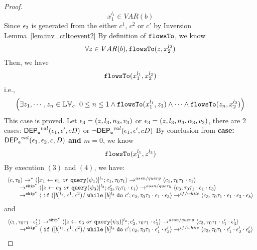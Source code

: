 {\begin{proof}
 \[
  x_1^{l_1} \in VAR(b)
 \]
 Since $\mathtt{\epsilon}_2$ is generated from the either $c^1$, $c^2$ or $c'$ by {Inversion Lemma~\ref{lem:inv_ctltoevent2}}
 By definition of $\mathtt{flowsTo}$, we know
 \[
 \forall z \in VAR(b), \mathtt{flowsTo}(z, x_2^{l2})
 \]
 Then, we have
 \[
 \mathtt{flowsTo}(x_1^{l_1}, x_2^{l_2})
 \]
 i.e.,
 \[
 \Big( \exists z_1, \cdots, z_n \in \mathbb{LV}_{{c}}. ~ 0 \leq n \leq 1 \land
  \mathtt{flowsTo}(x_1^{l_1}, z_1) 
  \land \cdots \land \mathtt{flowsTo}(z_n, x_2^{l_2}) \Big)
 \]
  This case is proved.
%
\subcaseL{$\event_3 \in \eventset^{\asn}$}
Let $\mathtt{\epsilon}_3 = (z, l_3, n_3, v_3)$ or $\mathtt{\epsilon}_3 = (z, l_3, n_3, \alpha_3, v_3)$, there are 2 cases:
$\mathsf{DEP_{\mathtt{e}}}^{val}(\mathtt{\epsilon}_1, \mathtt{\epsilon}', c D)$ or $\neg \mathsf{DEP_{\mathtt{e}}}^{val}(\mathtt{\epsilon}_1, \mathtt{\epsilon}', c D)$
%
%
By conclusion from \textbf{case: $\mathsf{DEP_{\mathtt{e}}}^{val}(\mathtt{\epsilon}_1, \mathtt{\epsilon}_2, c, D)$ and $m = 0$}, we know
\[
  \mathtt{flowsTo}(x_1^{l_1}, z^{l_3})
\]
%
By execution $(3)$ and $(4)$, we have:
\[
  \begin{array}{l}   
  \langle {c}, \mathtt{\tau}_0 \rangle 
  \rightarrow^{*} 
  \langle [\mathrel{ {x}_1 \leftarrow e_1~ or ~ {\tt query}(\psi_1) }]^{l_1} ; {c}_1, \mathtt{\tau}_0 \mathtt{\tau}_1 \rangle  \rightarrow^{assn/query}
 \langle c_1, \mathtt{\tau}_0 \mathtt{\tau}_1 \cdot \mathtt{\epsilon}_1 \rangle 
  \\ 
  \qquad \rightarrow^{\mathtt{skip}^*} 
  \langle [\mathrel{ z \leftarrow e_3~ or ~ {\tt query}(\psi_3) }]^{l_3}; {c}_2', 
  \mathtt{\tau}_0 \mathtt{\tau}_1 \cdot \mathtt{\epsilon}_1 \rangle 
  \rightarrow^{assn / query} 
  \langle {c}_3,  \mathtt{\tau}_0 \mathtt{\tau}_1 \cdot \mathtt{\epsilon}_1 \cdot \mathtt{\epsilon}_3 \rangle 
  \\ 
  \qquad \rightarrow^{\mathtt{skip}^*} 
  \langle \;\mathtt{if}\;([b]{}^{l_b}, c^1, c^2) / \;\mathtt{while}\; [b]{}^{l_b} \;\mathtt{do}\; c'; {c}_2, 
  \mathtt{\tau}_0 \mathtt{\tau}_1 \cdot \mathtt{\epsilon}_1 \cdot \mathtt{\epsilon}_3 \rangle 
  \rightarrow^{if / while} 
  \langle {c}_3,  \mathtt{\tau}_0 \mathtt{\tau}_1 \cdot \mathtt{\epsilon}_1 \cdot \mathtt{\epsilon}_3 \cdot \mathtt{\epsilon}_b \rangle 
\end{array}
 \]
and 
 \[
  \begin{array}{l}   
  \langle c_1, \mathtt{\tau}_0 \mathtt{\tau}_1 \cdot \mathtt{\epsilon}_1' \rangle 
  \rightarrow^{\mathtt{skip}^*} 
  \langle [\mathrel{ z \leftarrow e_3~ or ~ {\tt query}(\psi_3) }]^{l_3}; {c}_2', 
  \mathtt{\tau}_0 \mathtt{\tau}_1 \cdot \mathtt{\epsilon}_1' \rangle 
  \rightarrow^{assn / query} 
  \langle {c}_3,  \mathtt{\tau}_0 \mathtt{\tau}_1 \cdot \mathtt{\epsilon}_1' \cdot \mathtt{\epsilon}_3' \rangle 
  \\ 
  \qquad \rightarrow^{\mathtt{skip}^*} 
  \langle \;\mathtt{if}\;([b]{}^{l_b}, c^1, c^2) / \;\mathtt{while}\; [b]{}^{l_b} \;\mathtt{do}\; c'; {c}_2, 
  \mathtt{\tau}_0 \mathtt{\tau}_1 \cdot \mathtt{\epsilon}_1' \cdot \mathtt{\epsilon}_3' \rangle 
  \rightarrow^{if / while} 
  \langle {c}_3,  \mathtt{\tau}_0 \mathtt{\tau}_1 \cdot \mathtt{\epsilon}_1' \cdot \mathtt{\epsilon}_3' \cdot \mathtt{\epsilon}_b' \rangle 

\end{array}\]
\end{proof}}
